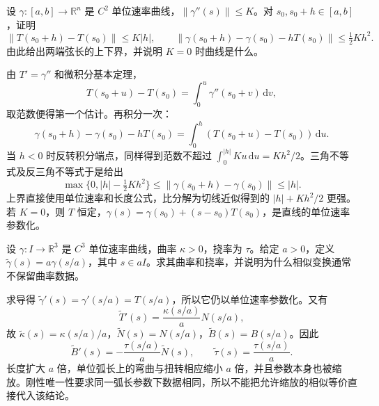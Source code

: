 \begin{exercise}\label{g1:ex:curvature-tangent-estimate}
	设 \(\gamma:[a,b]\to\mathbb R^n\) 是 \(C^2\) 单位速率曲线，\(\lVert\gamma''(s)\rVert\le K\)。对 \(s_0,s_0+h\in[a,b]\)，证明
	\[
		\lVert T(s_0+h)-T(s_0)\rVert\le K|h|,\qquad
		\lVert\gamma(s_0+h)-\gamma(s_0)-hT(s_0)\rVert\le\tfrac12Kh^2.
	\]
	由此给出两端弦长的上下界，并说明 \(K=0\) 时曲线是什么。
\end{exercise}
\begin{solution}
	由 \(T'=\gamma''\) 和微积分基本定理，
	\[
		T(s_0+u)-T(s_0)=\int_0^u\gamma''(s_0+v)\,\mathrm dv,
	\]
	取范数便得第一个估计。再积分一次：
	\[
		\gamma(s_0+h)-\gamma(s_0)-hT(s_0)=\int_0^h(T(s_0+u)-T(s_0))\,\mathrm du.
	\]
	当 \(h<0\) 时反转积分端点，同样得到范数不超过 \(\int_0^{|h|}Ku\,\mathrm du=Kh^2/2\)。三角不等式及反三角不等式于是给出
	\[
		\max\{0,|h|-\tfrac12Kh^2\}\le\lVert\gamma(s_0+h)-\gamma(s_0)\rVert\le|h|.
	\]
	上界直接使用单位速率和长度公式，比分解为切线近似得到的 \(|h|+Kh^2/2\) 更强。若 \(K=0\)，则 \(T\) 恒定，\(\gamma(s)=\gamma(s_0)+(s-s_0)T(s_0)\)，是直线的单位速率参数化。
\end{solution}

\begin{exercise}
	\label{g1:ex:curve-data-scaling}
	设 \(\gamma\colon I\rightarrow\mathbb R^3\) 是 \(C^3\) 单位速率曲线，曲率 \(\kappa>0\)，挠率为 \(\tau\)。给定 \(a>0\)，定义 \(\widetilde\gamma(s)=a\gamma(s/a)\)，其中 \(s\in aI\)。求其曲率和挠率，并说明为什么相似变换通常不保留曲率数据。
\end{exercise}
\begin{solution}
	求导得 \(\widetilde\gamma'(s)=\gamma'(s/a)=T(s/a)\)，所以它仍以单位速率参数化。又有
	\[
		\widetilde T'(s)=\frac{\kappa(s/a)}aN(s/a),
	\]
	故 \(\widetilde\kappa(s)=\kappa(s/a)/a\)，\(\widetilde N(s)=N(s/a)\)，\(\widetilde B(s)=B(s/a)\)。因此
	\[
		\widetilde B'(s)=-\frac{\tau(s/a)}a\widetilde N(s),\qquad
		\widetilde\tau(s)=\frac{\tau(s/a)}a.
	\]
	长度扩大 \(a\) 倍，单位弧长上的弯曲与扭转相应缩小 \(a\) 倍，并且参数本身也被缩放。刚性唯一性要求同一弧长参数下数据相同，所以不能把允许缩放的相似等价直接代入该结论。
\end{solution}

